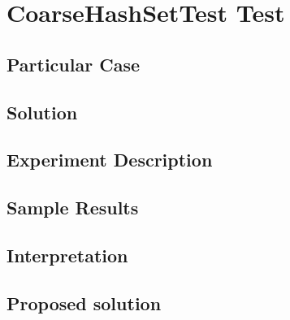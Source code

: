 \section{\textbf{CoarseHashSetTest Test}}
\subsection{Particular Case}
\par
\par
\subsection{Solution}
\par
\par
\subsection{Experiment Description}
\par
\par
\subsection{Sample Results}
\par
\par
\subsection{Interpretation}
\par
\par
\subsection{Proposed solution}
\par
\par
